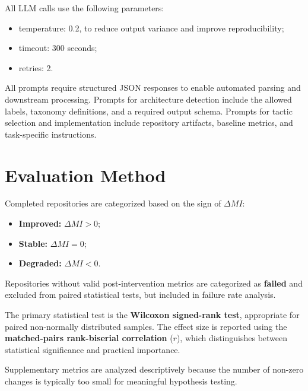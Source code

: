 All LLM calls use the following parameters:

\begin{itemize}
    \item temperature: 0.2, to reduce output variance and improve reproducibility;
    \item timeout: 300 seconds;
    \item retries: 2.
\end{itemize}

All prompts require structured JSON responses to enable automated parsing and downstream processing. Prompts for architecture detection include the allowed labels, taxonomy definitions, and a required output schema. Prompts for tactic selection and implementation include repository artifacts, baseline metrics, and task-specific instructions.

\section{Evaluation Method}
\label{sec:met_eval}

Completed repositories are categorized based on the sign of $\Delta MI$:

\begin{itemize}
    \item \textbf{Improved:} $\Delta MI > 0$;
    \item \textbf{Stable:} $\Delta MI = 0$;
    \item \textbf{Degraded:} $\Delta MI < 0$.
\end{itemize}

Repositories without valid post-intervention metrics are categorized as \textbf{failed} and excluded from paired statistical tests, but included in failure rate analysis.

The primary statistical test is the \textbf{Wilcoxon signed-rank test}, appropriate for paired non-normally distributed samples. The effect size is reported using the \textbf{matched-pairs rank-biserial correlation} ($r$), which distinguishes between statistical significance and practical importance.

Supplementary metrics are analyzed descriptively because the number of non-zero changes is typically too small for meaningful hypothesis testing.

